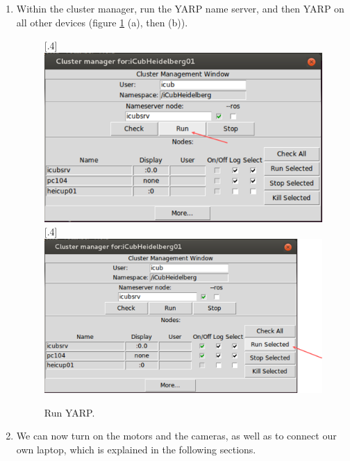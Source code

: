 \begin{enumerate}
	\newline {}
	\item Within the cluster manager, run the YARP name server, and then YARP on all other devices (figure \ref{fig::B1_cluster} (a), then (b)).
	\begin{figure}[h!]
		\centering
		[.4\linewidth]{\includegraphics[scale=.3]{chapters/06_appendix/img/ran_yarp.png}}
		[.4\linewidth]{\includegraphics[scale=.3]{chapters/06_appendix/img/ran_yarp_others.png}}
		\caption{Run YARP.}
		\label{fig::B1_cluster}
	\end{figure}
	\item We can now turn on the motors and the cameras, as well as to connect our own laptop, which is explained in the following sections.
\end{enumerate}
\FloatBarrier
